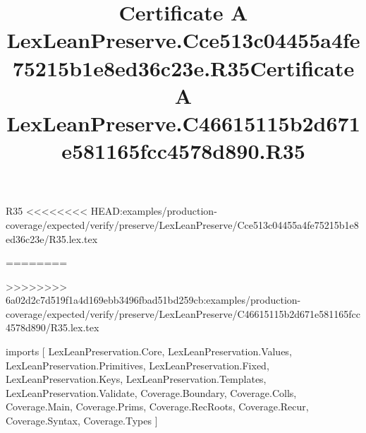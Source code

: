 \begin{lexlean}{R35}
<<<<<<<< HEAD:examples/production-coverage/expected/verify/preserve/LexLeanPreserve/Cce513c04455a4fe75215b1e8ed36c23e/R35.lex.tex
\title{Certificate A LexLeanPreserve.Cce513c04455a4fe75215b1e8ed36c23e.R35}
========
\title{Certificate A LexLeanPreserve.C46615115b2d671e581165fcc4578d890.R35}
>>>>>>>> 6a02d2c7d519f1a4d169ebb3496fbad51bd259cb:examples/production-coverage/expected/verify/preserve/LexLeanPreserve/C46615115b2d671e581165fcc4578d890/R35.lex.tex
\begin{coremodule}
imports [
  LexLeanPreservation.Core,
  LexLeanPreservation.Values,
  LexLeanPreservation.Primitives,
  LexLeanPreservation.Fixed,
  LexLeanPreservation.Keys,
  LexLeanPreservation.Templates,
  LexLeanPreservation.Validate,
  Coverage.Boundary,
  Coverage.Colls,
  Coverage.Main,
  Coverage.Prims,
  Coverage.RecRoots,
  Coverage.Recur,
  Coverage.Syntax,
  Coverage.Types
]


\end{coremodule}
\end{lexlean}
